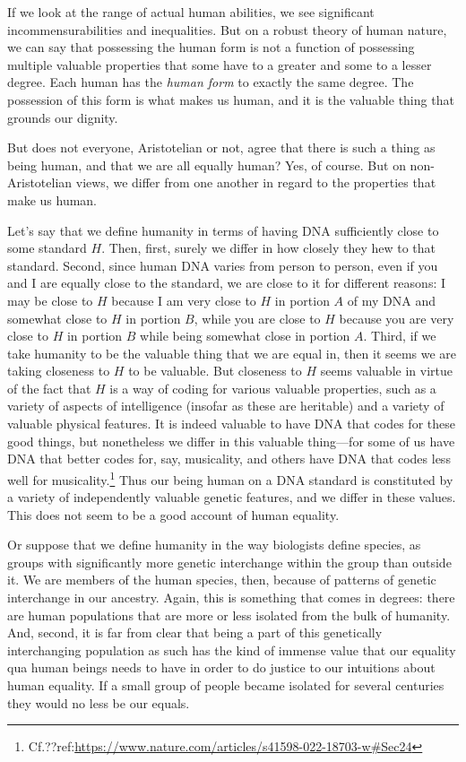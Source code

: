If we look at the range of actual human abilities, we see significant incommensurabilities and inequalities. But on a robust theory of human nature, we can say that possessing the human form is not a function of possessing multiple valuable properties that some have to a 
greater and some to a lesser degree. Each human has the \textit{human form} to exactly the same degree. The 
possession of this form is what makes us human, and it is the valuable thing that grounds our dignity. 

But does not everyone, Aristotelian or not, agree that there is such a thing as being human, and that we are all 
equally human? Yes, of course. But on non-Aristotelian views, we differ from one another in regard to the properties
that make us human. 

Let's say that we define humanity in terms of having DNA sufficiently close to some standard $H$.
Then, first, surely we differ in how closely they hew to that standard. Second, since human DNA varies from
person to person, even if you and I are equally close to the
standard, we are close to it for different reasons: I may be close to $H$ because I am very close to $H$ in portion $A$ of
my DNA and somewhat close to $H$ in portion $B$, while you are close to $H$ because you are very close to $H$ in portion
$B$ while being somewhat close in portion $A$. Third, if we take humanity to be the valuable thing that we are equal in,
then it seems we are taking closeness to $H$ to be valuable. But closeness to $H$ seems valuable in virtue of the fact
that $H$ is a way of coding for various valuable properties, such as a variety of aspects of intelligence (insofar as these
are heritable) and a variety of valuable physical features. It is indeed valuable to have DNA that codes for these good
things, but nonetheless we differ in this valuable thing---for some of us have DNA that better codes for, say, musicality, and others have DNA that codes less well for musicality.\footnote{Cf.??ref:\url{https://www.nature.com/articles/s41598-022-18703-w#Sec24}} Thus our being human on a DNA standard is constituted by a variety of independently valuable genetic features,
and we differ in these values. This does not seem to be a good account of human equality.

Or suppose that we define humanity in the way biologists define species, as groups with significantly more genetic interchange
within the group than outside it. We are members of the human species, then, because of patterns of genetic interchange in our
ancestry. Again, this is something that comes in degrees: there are human populations that are more or less isolated from the 
bulk of humanity. And, second, it is far from clear that being a part of this genetically interchanging population as such
has the kind of immense value that our equality qua human beings needs to have in order to do justice to our intuitions about
human equality. If a small group of people became isolated for several centuries they would no less be our equals.

